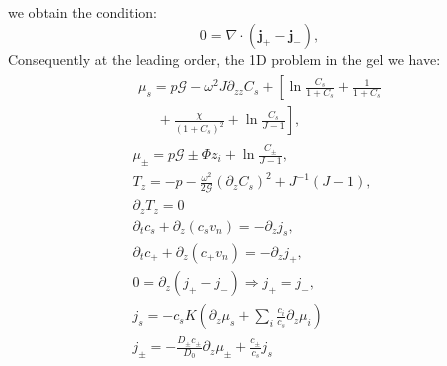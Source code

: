\documentclass[12pt]{extarticle}
\begin{document}
we obtain the condition:
\begin{equation}
0= \nabla\cdot(\mathbf{j}_+-\mathbf{j}_-),
\end{equation}
Consequently at the leading order, the 1D problem in the gel we have:
\begin{gather}
\begin{aligned}
\mu_s = p \mathcal{G} - \omega^2 J \partial_{zz} C_s + \left[\ln \frac{C_s}{1+C_s} + \frac{1}{1+C_s}\right.\\
\left.\ \ \ \ \ \ +\frac{\chi}{(1+C_s)^2} + \ln \frac{C_s}{J-1} \right], 
\end{aligned}\\[2.5mm]
\mu_\pm = p \mathcal{G} \pm \Phi z_i + \ln \frac{C_\pm}{J-1} ,\\
T_z= -p -\frac{\omega^2 }{2\mathcal{G}} (\partial_z C_s)^2+ J^{-1}\left(J-1\right),\\
\partial_z T_z=0\\
\partial_t c_s + \partial_z (c_s v_n)=- \partial_z j_s,\\
\partial_t c_+ +\partial_z (c_+ v_n)= -\partial_zj_+,\\
0= \partial_z(j_+-j_-) \Rightarrow j_+=j_-,\\
j_s =-c_sK  \left(\partial_z\mu_s +\sum_i \frac{c_i}{c_s} \partial_z \mu_i\right)\\
j_\pm= - \frac{D_\pm c_\pm}{D_0}\partial_z \mu_\pm + \frac{c_\pm}{c_s}j_s
\end{gather}
\end{document}

